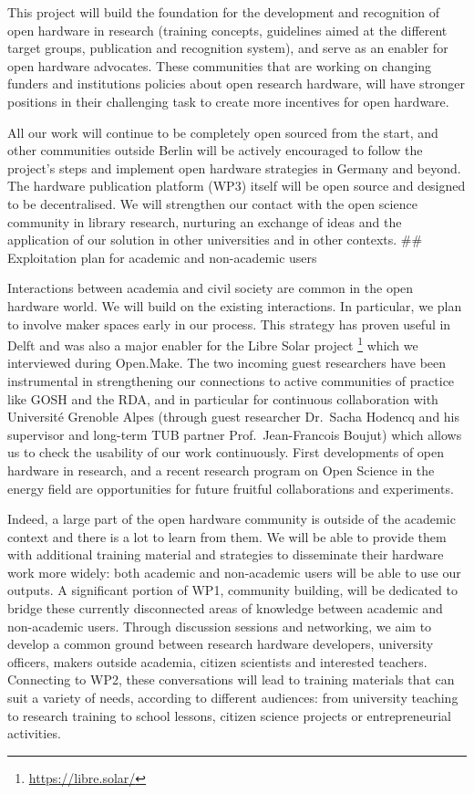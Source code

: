 \documentclass[
  12pt,
  a4paper,
]{article}
\begin{document}
This project will build the foundation for the development and
recognition of open hardware in research (training concepts, guidelines
aimed at the different target groups, publication and recognition
system), and serve as an enabler for open hardware advocates. These
communities that are working on changing funders and institutions
policies about open research hardware, will have stronger positions in
their challenging task to create more incentives for open hardware.

All our work will continue to be completely open sourced from the start,
and other communities outside Berlin will be actively encouraged to
follow the project's steps and implement open hardware strategies in
Germany and beyond. The hardware publication platform (WP3) itself will
be open source and designed to be decentralised. We will strengthen our
contact with the open science community in library research, nurturing
an exchange of ideas and the application of our solution in other
universities and in other contexts. \#\# Exploitation plan for academic
and non-academic users

Interactions between academia and civil society are common in the open
hardware world. We will build on the existing interactions. In
particular, we plan to involve maker spaces early in our process. This
strategy has proven useful in Delft and was also a major enabler for the
Libre Solar project \footnote{\url{https://libre.solar/}} which we
interviewed during Open.Make. The two incoming guest researchers have
been instrumental in strengthening our connections to active communities
of practice like GOSH and the RDA, and in particular for continuous
collaboration with Université Grenoble Alpes (through guest researcher
Dr.~Sacha Hodencq and his supervisor and long-term TUB partner
Prof.~Jean-Francois Boujut) which allows us to check the usability of
our work continuously. First developments of open hardware in research,
and a recent research program on Open Science in the energy field are
opportunities for future fruitful collaborations and experiments.

Indeed, a large part of the open hardware community is outside of the
academic context and there is a lot to learn from them. We will be able
to provide them with additional training material and strategies to
disseminate their hardware work more widely: both academic and
non-academic users will be able to use our outputs. A significant
portion of WP1, community building, will be dedicated to bridge these
currently disconnected areas of knowledge between academic and
non-academic users. Through discussion sessions and networking, we aim
to develop a common ground between research hardware developers,
university officers, makers outside academia, citizen scientists and
interested teachers. Connecting to WP2, these conversations will lead to
training materials that can suit a variety of needs, according to
different audiences: from university teaching to research training to
school lessons, citizen science projects or entrepreneurial activities.
\end{document}
